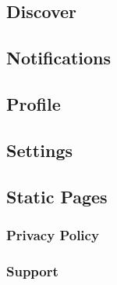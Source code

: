 \subsection{Discover}
\subsection{Notifications}
\subsection{Profile}
\subsection{Settings}
\subsection{Static Pages}
\subsubsection{Privacy Policy}
\subsubsection{Support}